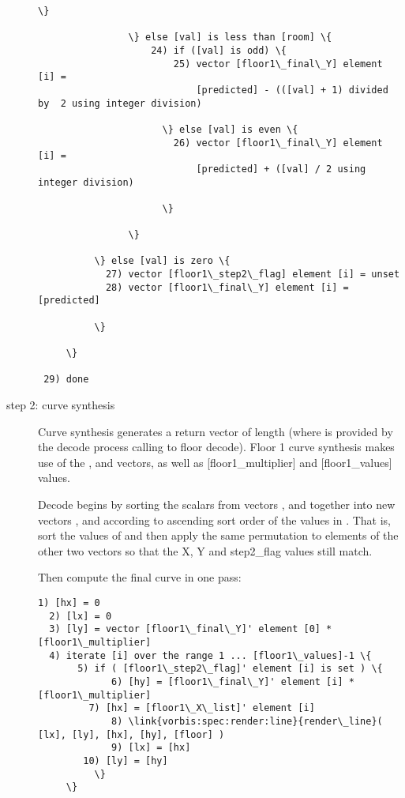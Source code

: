 \begin{description}
\begin{Verbatim}[commandchars=\\\{\}]
                      \}

                \} else [val] is less than [room] \{
                    24) if ([val] is odd) \{
                        25) vector [floor1\_final\_Y] element [i] =
                            [predicted] - (([val] + 1) divided by  2 using integer division)

                      \} else [val] is even \{
                        26) vector [floor1\_final\_Y] element [i] =
                            [predicted] + ([val] / 2 using integer division)

                      \}

                \}

          \} else [val] is zero \{
            27) vector [floor1\_step2\_flag] element [i] = unset
            28) vector [floor1\_final\_Y] element [i] = [predicted]

          \}

     \}

 29) done

\end{Verbatim}



\item[step 2: curve synthesis]

Curve synthesis generates a return vector \varname{[floor]} of length
\varname{[n]} (where \varname{[n]} is provided by the decode process
calling to floor decode).  Floor 1 curve synthesis makes use of the
,  and
 vectors, as well as [floor1\_multiplier]
and [floor1\_values] values.

Decode begins by sorting the scalars from vectors
,  and
 together into new vectors
,  and
 according to ascending sort order of the
values in .  That is, sort the values of
 and then apply the same permutation to
elements of the other two vectors so that the X, Y and step2\_flag
values still match.

Then compute the final curve in one pass:

\begin{Verbatim}[commandchars=\\\{\}]
  1) [hx] = 0
  2) [lx] = 0
  3) [ly] = vector [floor1\_final\_Y]' element [0] * [floor1\_multiplier]
  4) iterate [i] over the range 1 ... [floor1\_values]-1 \{
       5) if ( [floor1\_step2\_flag]' element [i] is set ) \{
             6) [hy] = [floor1\_final\_Y]' element [i] * [floor1\_multiplier]
 	     7) [hx] = [floor1\_X\_list]' element [i]
             8) \link{vorbis:spec:render:line}{render\_line}( [lx], [ly], [hx], [hy], [floor] )
             9) [lx] = [hx]
	    10) [ly] = [hy]
          \}
     \}


\end{Verbatim}
\end{description}
